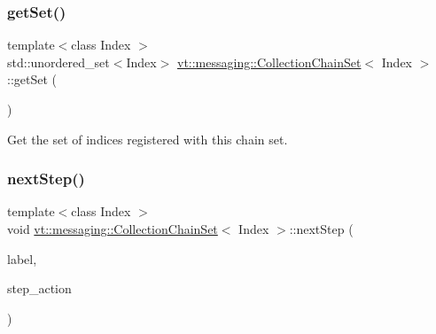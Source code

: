 \mbox{\label{classvt_1_1messaging_1_1_collection_chain_set_a17bcba0392b2ae7c68a3c3630b71ffa3}} 
\subsubsection{\texorpdfstring{get\+Set()}{getSet()}}
{\footnotesize\ttfamily template$<$class Index $>$ \\
std\+::unordered\+\_\+set$<$Index$>$ \hyperlink{classvt_1_1messaging_1_1_collection_chain_set}{vt\+::messaging\+::\+Collection\+Chain\+Set}$<$ Index $>$\+::get\+Set (\begin{DoxyParamCaption}{ }\end{DoxyParamCaption})\hspace{0.3cm}{\ttfamily [inline]}}



Get the set of indices registered with this chain set. 

\mbox{\label{classvt_1_1messaging_1_1_collection_chain_set_aa6ab934f32d8623872cfcd7ed9e147b2}} 
\subsubsection{\texorpdfstring{next\+Step()}{nextStep()}\hspace{0.1cm}{\footnotesize\ttfamily [1/2]}}
{\footnotesize\ttfamily template$<$class Index $>$ \\
void \hyperlink{classvt_1_1messaging_1_1_collection_chain_set}{vt\+::messaging\+::\+Collection\+Chain\+Set}$<$ Index $>$\+::next\+Step (\begin{DoxyParamCaption}\item[{std\+::string const \&}]{label,  }\item[{std\+::function$<$ \hyperlink{structvt_1_1messaging_1_1_pending_send}{Pending\+Send}(Index)$>$}]{step\+\_\+action }\end{DoxyParamCaption})\hspace{0.3cm}{\ttfamily [inline]}}



